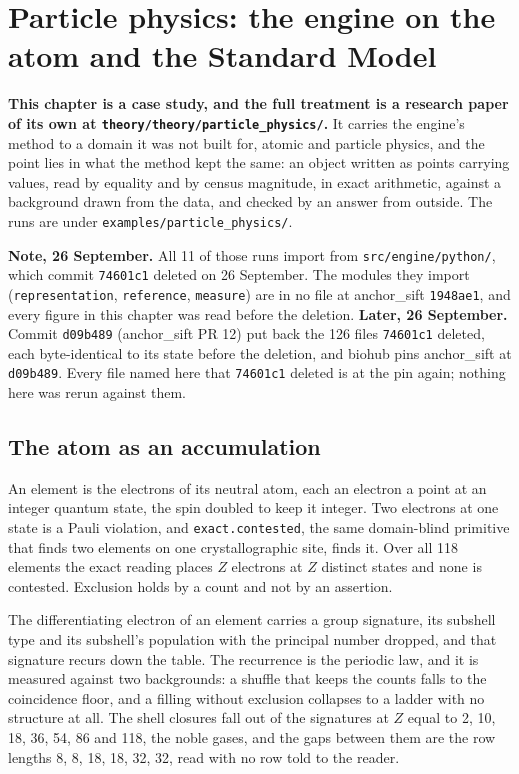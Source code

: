 \chapter{Particle physics: the engine on the atom and the Standard Model}

\textbf{This chapter is a case study, and the full treatment is a research paper of its own at
\texttt{theory/\allowbreak{}theory/\allowbreak{}particle\_physics/}.} It carries the engine's method to a domain it was not
built for, atomic and particle physics, and the point lies in what the method kept the same: an object
written as points carrying values, read by equality and by census magnitude, in exact arithmetic,
against a background drawn from the data, and checked by an answer from outside. The runs are under
\texttt{examples/\allowbreak{}particle\_physics/}.

\textbf{Note, 26 September.} All 11 of those runs import from \texttt{src/\allowbreak{}engine/\allowbreak{}python/},
which commit \texttt{74601c1} deleted on 26 September. The modules they import
(\texttt{representation}, \texttt{reference}, \texttt{measure}) are in no file at anchor\_sift
\texttt{1948ae1}, and every figure in this chapter was read before the deletion.
\textbf{Later, 26 September.} Commit \texttt{d09b489} (anchor\_sift PR 12) put back the 126 files
\texttt{74601c1} deleted, each byte-identical to its state before the deletion, and biohub pins
anchor\_sift at \texttt{d09b489}. Every file named here that \texttt{74601c1} deleted is at the pin
again; nothing here was rerun against them.

\section{The atom as an accumulation}

An element is the electrons of its neutral atom, each an electron a point at an integer quantum state,
the spin doubled to keep it integer. Two electrons at one state is a Pauli violation, and
\texttt{exact.contested}, the same domain-blind primitive that finds two elements on one
crystallographic site, finds it. Over all 118 elements the exact reading places $Z$ electrons at $Z$
distinct states and none is contested. Exclusion holds by a count and not by an assertion.

The differentiating electron of an element carries a group signature, its subshell type and its
subshell's population with the principal number dropped, and that signature recurs down the table. The
recurrence is the periodic law, and it is measured against two backgrounds: a shuffle that keeps the
counts falls to the coincidence floor, and a filling without exclusion collapses to a ladder with no
structure at all. The shell closures fall out of the signatures at $Z$ equal to 2, 10, 18, 36, 54, 86
and 118, the noble gases, and the gaps between them are the row lengths 8, 8, 18, 18, 32, 32, read with
no row told to the reader.

